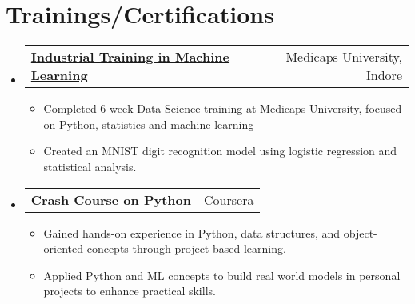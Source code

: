 \documentclass[letterpaper,10pt]{article}
\makeatletter
\newcommand{\resumeItem}[1]{
    \item\small{
      {#1 \vspace{-2pt}}
    }
  }
\newcommand{\resumeCertheading}[2]{
    \vspace{5pt}\item
      \begin{tabular*}{0.97\textwidth}[t]{l@{\extracolsep{\fill}}r}
        {#1} & #2 \\
      \end{tabular*}\vspace{-7pt}
  }
\newcommand{\resumeSubSubheading}[2]{
      \item
      \begin{tabular*}{0.97\textwidth}{l@{\extracolsep{\fill}}r}
        \textit{\small#1} & \textit{\small #2} \\
      \end{tabular*}\vspace{-7pt}
  }
\newcommand{\resumeSubHeadingListStart}{\begin{itemize}[leftmargin=0.15in, label={}]}
\newcommand{\resumeSubHeadingListEnd}{\end{itemize}}
\newcommand{\resumeItemListStart}{\begin{itemize}}
\newcommand{\resumeItemListEnd}{\end{itemize}\vspace{-5pt}}
\makeatother
\begin{document}
\section{Trainings/Certifications}
\resumeSubHeadingListStart

\resumeCertheading
{\textbf{\href{https://medicaps.ac.in/}{Industrial Training in Machine Learning}}}{Medicaps University, Indore}
\resumeItemListStart
\resumeItem{Completed 6-week Data Science training at Medicaps University, focused on Python, statistics and machine learning}
\resumeItem{Created an MNIST digit recognition model using logistic regression and statistical analysis.}
\resumeItemListEnd



\resumeCertheading
{\textbf{\href{https://coursera.org/verify/FHDUZAK7YL3Q}{Crash Course on Python}\hspace{3pt}}{{}}}{Coursera}
\resumeItemListStart
\resumeItem{Gained hands-on experience in Python, data structures, and object-oriented concepts through project-based learning.}

\resumeItem{Applied Python and ML concepts to build real world models in personal projects to enhance practical skills.}
\resumeItemListEnd
\resumeSubHeadingListEnd
\end{document}
